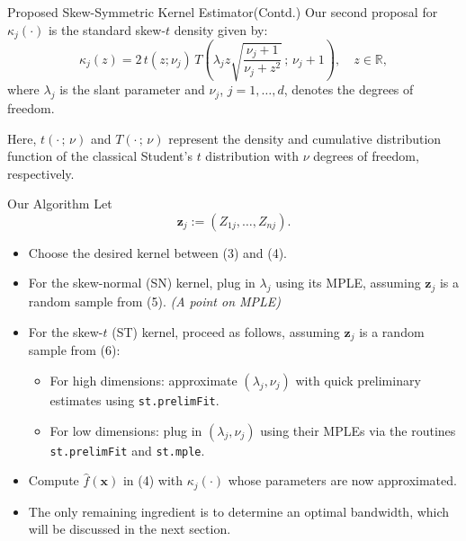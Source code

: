 \begin{frame}{Proposed Skew-Symmetric Kernel Estimator(Contd.)}
Our second proposal for $\kappa_j(\cdot)$ is the standard skew-$t$ density given by:
\begin{equation}
\kappa_j(z) = 2 \, t(z; \nu_j)\, 
T\!\left( \lambda_j z \sqrt{\frac{\nu_j + 1}{\nu_j + z^2}} \, ; \, \nu_j + 1 \right), 
\quad z \in \mathbb{R},
\end{equation}
where $\lambda_j$ is the slant parameter and $\nu_j$, $j = 1, \ldots, d$, denotes the degrees of freedom.

Here, $t(\cdot \, ; \, \nu)$ and $T(\cdot \, ; \, \nu)$ represent the density and cumulative distribution function of the classical Student's $t$ distribution with $\nu$ degrees of freedom, respectively.
\end{frame}
\begin{frame}{Our Algorithm}
Let 
\[
\mathbf{z}_j := (Z_{1j}, \ldots, Z_{nj}).
\]

\begin{itemize}
    \item Choose the desired kernel between (3) and (4).

    \item For the skew-normal (SN) kernel, plug in $\lambda_j$ using its MPLE, assuming $\mathbf{z}_j$ is a random sample from (5). \textit{(A point on MPLE)}

    \item For the skew-$t$ (ST) kernel, proceed as follows, assuming $\mathbf{z}_j$ is a random sample from (6):
    \begin{itemize}
        \item[(i)] For high dimensions: approximate $(\lambda_j, \nu_j)$ with quick preliminary estimates using \texttt{st.prelimFit}.
        
        \item[(ii)] For low dimensions: plug in $(\lambda_j, \nu_j)$ using their MPLEs via the routines \texttt{st.prelimFit} and \texttt{st.mple}.
    \end{itemize}

    \item Compute $\hat{f}(\mathbf{x})$ in (4) with $\kappa_j(\cdot)$ whose parameters are now approximated.

    \item The only remaining ingredient is to determine an optimal bandwidth, which will be discussed in the next section.
\end{itemize}
    
\end{frame}
